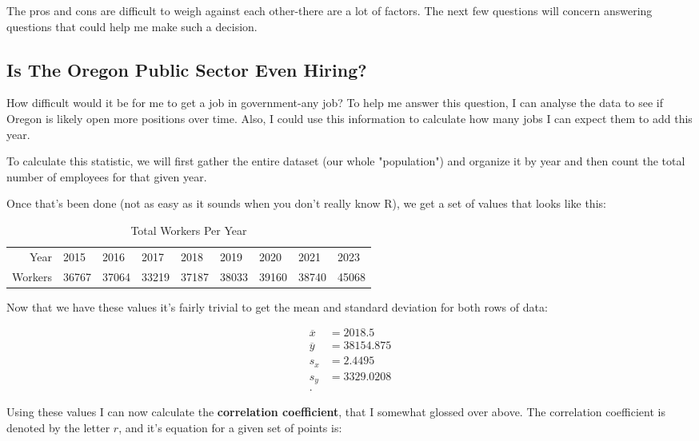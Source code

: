 \documentclass[letterpaper]{article}
\theoremstyle{definition}
\begin{document}
The pros and cons are difficult to weigh against each other-there are a lot of factors.
The next few questions will concern answering questions that could help me make such a
decision.


    \hypertarget{will-the-public-sector-even-be-hiring}{%
\subsection{Is The Oregon Public Sector Even Hiring?}\label{will-the-public-sector-even-be-hiring}}

How difficult would it be for me to get a job in government-any job? To help me answer
this question, I can analyse the data to see if Oregon is likely open more positions over
time. Also, I could use this information to calculate how many jobs I can expect them to
add this year.

To calculate this statistic, we will first gather the entire dataset (our whole
"population") and organize it by year and then count the total number of employees for
that given year.

Once that's been done (not as easy as it sounds when you don't really know R), we get a
set of values that looks like this:

\begin{table}[H]
	\centering
	\caption{Total Workers Per Year}
	\label{tab:label}
	\begin{tabular}{r|llllllll}
		Year & 2015& 2016&2017&2018&2019&2020&2021&2023\\
		Workers & 36767&37064&33219&37187&38033&39160&38740&45068
	\end{tabular}
\end{table}

Now that we have these values it's fairly trivial to get the mean and standard deviation
for both rows of data:

\begin{align*}
	\overline{x}&= 2018.5 \\
	\overline{y}&= 38154.875 \\
	s_{x} &= 2.4495 \\
	s_{y}&= 3329.0208 \\
.\end{align*}

Using these values I can now calculate the
\textbf{correlation coefficient}, that I somewhat glossed over above. The correlation
coefficient is denoted by the letter $r$, and it's equation for a given set of points is:
\end{document}

